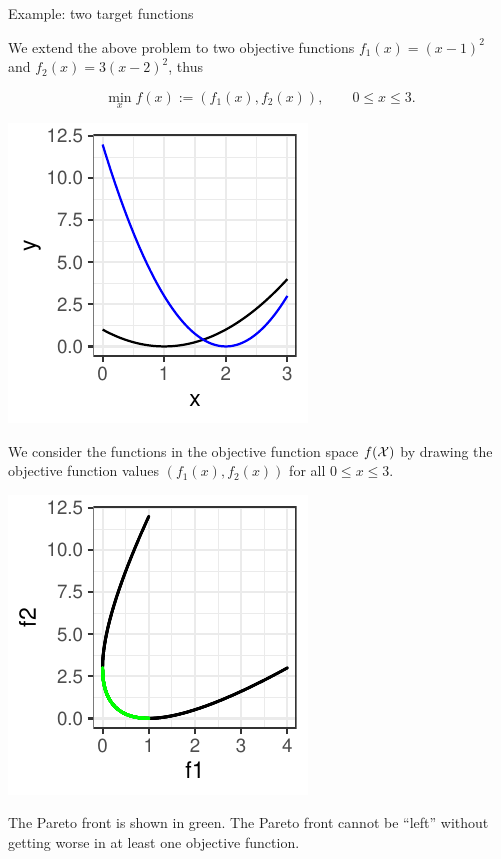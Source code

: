 \begin{frame}[allowframebreaks]{Example: two target functions}

We extend the above problem to two objective functions $f_1(x) = (x - 1)^2$ and $f_2(x) = 3(x - 2)^2$, thus

$$
\min_x f(x) := \left(f_1(x), f_2(x)\right), \qquad 0 \le x \le 3.
$$

\vspace*{0.1cm}


\centering \includegraphics[width=\maxwidth,height=0.5\textheight]{images/expedia-7-1}


\framebreak

We consider the functions in the objective function space $f(\mathcal{X})$ by drawing the objective function values $\left(f_1(x), f_2(x)\right)$ for all $0 \le x \le 3$.

\vspace*{0.1cm}


\centering \includegraphics[width=\maxwidth,height=0.5\textheight]{images/expedia-8-1}

    \vspace*{-0.3cm}

The Pareto front is shown in green.
The Pareto front cannot be \enquote{left} without getting worse in at least one objective function.

\end{frame}


